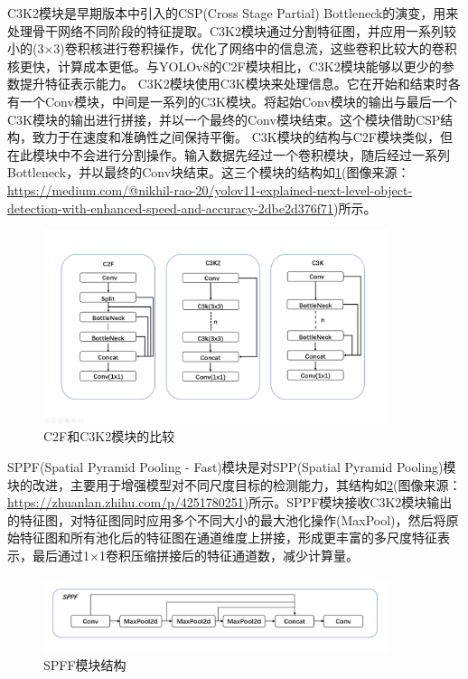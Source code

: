 C3K2模块是早期版本中引入的CSP(Cross Stage Partial) Bottleneck的演变，用来处理骨干网络不同阶段的特征提取。C3K2模块通过分割特征图，并应用一系列较小的(3$\times$3)卷积核进行卷积操作，优化了网络中的信息流，这些卷积比较大的卷积核更快，计算成本更低。与YOLOv8的C2F模块相比，C3K2模块能够以更少的参数提升特征表示能力。
C3K2模块使用C3K模块来处理信息。它在开始和结束时各有一个Conv模块，中间是一系列的C3K模块。将起始Conv模块的输出与最后一个C3K模块的输出进行拼接，并以一个最终的Conv模块结束。这个模块借助CSP结构，致力于在速度和准确性之间保持平衡。
C3K模块的结构与C2F模块类似，但在此模块中不会进行分割操作。输入数据先经过一个卷积模块，随后经过一系列Bottleneck，并以最终的Conv块结束。这三个模块的结构如\ref{fig:c3k}(图像来源：\url{https://medium.com/@nikhil-rao-20/yolov11-explained-next-level-object-detection-with-enhanced-speed-and-accuracy-2dbe2d376f71})所示。

\begin{figure}[!htb]
  \centering
  \includegraphics[width=0.9\textwidth]{figs/chap02/c2f.png}
  \caption{C2F和C3K2模块的比较}
  \label{fig:c3k}
\end{figure}

SPPF(Spatial Pyramid Pooling - Fast)模块是对SPP(Spatial Pyramid Pooling)模块的改进，主要用于增强模型对不同尺度目标的检测能力，其结构如\ref{fig:sppf}(图像来源：\url{https://zhuanlan.zhihu.com/p/4251780251})所示。SPPF模块接收C3K2模块输出的特征图，对特征图同时应用多个不同大小的最大池化操作(MaxPool)，然后将原始特征图和所有池化后的特征图在通道维度上拼接，形成更丰富的多尺度特征表示，最后通过1×1卷积压缩拼接后的特征通道数，减少计算量。

\begin{figure}[!htb]
  \centering
  \includegraphics[width=0.9\textwidth]{figs/chap02/sppf.png}
  \caption{SPFF模块结构}
  \label{fig:sppf}
\end{figure}

